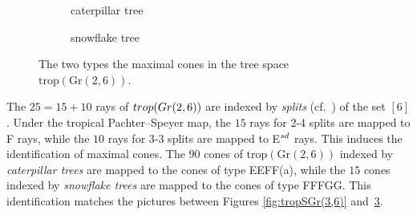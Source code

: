 \documentclass[12pt]{extarticle}
\theoremstyle{definition}
\numberwithin{theorem}{section}
\theoremstyle{plain}\newtheorem{ithm}{Theorem}
\begin{document}
  
  \begin{figure}[h]%
    \centering
    \begin{subfigure}{0.45\textwidth}\centering
      \caption{caterpillar tree}
       \label{fig:caterpillar}
    \end{subfigure}
    \begin{subfigure}{0.45\textwidth}
      \centering
      \caption{snowflake tree}
       \label{fig:snowflake}
    \end{subfigure}
    \caption{The two types the maximal cones in the tree space
    $\text{trop}(\text{Gr}(2,6))$.}\label{fig:trees}
  \end{figure}


  
The $25 =15+10$ rays of  ${\rm trop}({\rm Gr}(2,6))$  are indexed by {\em splits}
(cf.~\cite[Example 4.3.15]{MS}) of the set $[6]$.
 Under the tropical Pachter--Speyer map, the $15$ rays for 2-4 splits are 
mapped to F rays, while the $10$ rays for 3-3 splits are mapped
to   E$^{\rm sd}$ rays. This induces the identification of maximal cones.
The $90$ cones of  $\text{trop}(\text{Gr}(2,6))$  indexed by 
{\em caterpillar trees} are mapped to the cones of type  EEFF(a),
while the $15$ cones indexed by {\em snowflake trees} are mapped
to the cones  of type FFFGG. This identification matches the
pictures between Figures \ref{fig:tropSGr(3,6)} and~\ref{fig:trees}.
  
\end{document}
